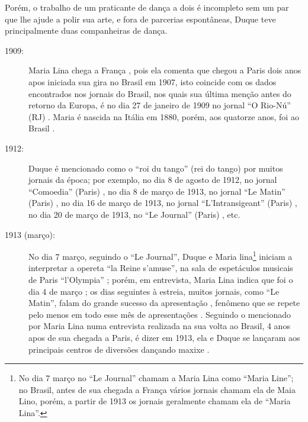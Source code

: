 Porém, o trabalho de um praticante de dança a dois é incompleto sem um par
que lhe ajude a polir sua arte,
e fora de parcerias espontâneas, Duque teve principalmente duas companheiras de dança.
\begin{description}

\item[1909:] Maria Lina chega a França \cite[pp. 3]{maxixe1913marialina},
pois ela comenta que chegou a Paris dois anos apos iniciada sua gira no Brasil em 1907,
isto coincide com os dados encontrados nos jornais do Brasil, 
nos quais sua última menção antes do retorno da Europa,
é no dia 27 de janeiro de 1909 no jornal ``O Rio-Nú'' (RJ) \cite[pp. 3]{maxixe1909maria}.
Maria é nascida na Itália em 1880, porém, aos quatorze anos, foi ao Brasil \cite[pp. 63]{efege1974maxixe}.



\item[1912:] Duque é mencionado como o ``roi du tango'' (rei do tango)
por muitos jornais da época; por exemplo,
no dia 8 de agosto de 1912, no jornal ``Comoedia'' (Paris) \cite[pp. 3]{maxixe1913reidotango:0:b},
no dia 8 de março de 1913, no jornal ``Le Matin'' (Paris) \cite[pp. 4]{maxixe1913reidotango:0},
no dia 16 de março de 1913, no jornal ``L'Intransigeant'' (Paris)  \cite[pp. 3]{maxixe1913reidotango:1},
no dia 20 de março de 1913, no ``Le Journal'' (Paris) \cite[pp. 7]{maxixe1913reidotango:2}, 
etc.


\item[1913 (março):] No dia 7 março, seguindo o ``Le Journal'',  Duque e Maria lina\footnote{No dia 7 março
no ``Le Journal'' chamam a Maria Lina como ``Maria Line'';
no Brasil, antes de sua chegada a França vários jornais chamam ela de Maia Lino,
porém, a partir de 1913 os jornais geralmente chamam ela de ``Maria Lina''.} 
iniciam a interpretar a opereta ``la Reine s'amuse'',
na sala de espetáculos musicais de Paris ``l'Olympia'' \cite[pp. 8]{maxixe1913reidotango:0:a};
porém, em entrevista, Maria Lina indica que foi o dia 4 de março \cite[pp. 3]{maxixe1913marialina};
os dias seguintes à estreia, muitos jornais, como ``Le Matin'',
falam do grande sucesso da apresentação \cite[pp. 4]{maxixe1913reidotango:0},
fenômeno que se repete pelo menos em todo esse mês de apresentações 
\cite[pp. 4]{maxixe1913reidotango:0} \cite[pp. 3]{maxixe1913reidotango:1} \cite[pp. 7]{maxixe1913reidotango:2}.
Seguindo o mencionado por Maria Lina numa entrevista realizada na sua volta ao Brasil,
4 anos apos de sua chegada a Paris, é dizer em 1913, 
ela e Duque se lançaram aos principais centros de diversões dançando maxixe \cite[pp. 3]{maxixe1913marialina}.



\end{description}
